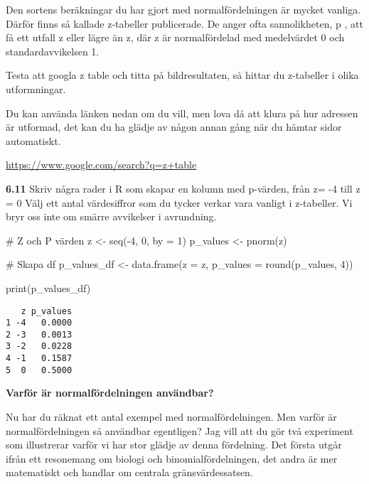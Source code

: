 \documentclass[
  letterpaper,
  DIV=11,
  numbers=noendperiod]{scrartcl}
\newenvironment{Shaded}{\begin{snugshade}}{\end{snugshade}}
\newcommand{\AttributeTok}[1]{\textcolor[rgb]{0.40,0.45,0.13}{#1}}
\newcommand{\CommentTok}[1]{\textcolor[rgb]{0.37,0.37,0.37}{#1}}
\newcommand{\DecValTok}[1]{\textcolor[rgb]{0.68,0.00,0.00}{#1}}
\newcommand{\FunctionTok}[1]{\textcolor[rgb]{0.28,0.35,0.67}{#1}}
\newcommand{\NormalTok}[1]{\textcolor[rgb]{0.00,0.23,0.31}{#1}}
\newcommand{\OtherTok}[1]{\textcolor[rgb]{0.00,0.23,0.31}{#1}}
\newcommand{\SpecialCharTok}[1]{\textcolor[rgb]{0.37,0.37,0.37}{#1}}
\begin{document}
Den sortens beräkningar du har gjort med normalfördelningen är mycket
vanliga. Därför finns så kallade z-tabeller publicerade. De anger ofta
sannolikheten, p , att få ett utfall z eller lägre än z, där z är
normalfördelad med medelvärdet 0 och standardavvikelsen 1.

Testa att googla z table och titta på bildresultaten, så hittar du
z-tabeller i olika utformningar.

Du kan använda länken nedan om du vill, men lova då att klura på hur
adressen är utformad, det kan du ha glädje av någon annan gång när du
hämtar sidor automatiskt.

\url{https://www.google.com/search?q=z+table}

\textbf{6.11} Skriv några rader i R som skapar en kolumn med p-värden,
från z= -4 till z = 0 Välj ett antal värdesiffror som du tycker verkar
vara vanligt i z-tabeller. Vi bryr oss inte om smärre avvikelser i
avrundning.

\begin{Shaded}
\begin{Highlighting}[]
\CommentTok{\# Z och P värden}
\NormalTok{z }\OtherTok{\textless{}{-}} \FunctionTok{seq}\NormalTok{(}\SpecialCharTok{{-}}\DecValTok{4}\NormalTok{, }\DecValTok{0}\NormalTok{, }\AttributeTok{by =} \DecValTok{1}\NormalTok{)}
\NormalTok{p\_values }\OtherTok{\textless{}{-}} \FunctionTok{pnorm}\NormalTok{(z)}

\CommentTok{\# Skapa df}
\NormalTok{p\_values\_df }\OtherTok{\textless{}{-}} \FunctionTok{data.frame}\NormalTok{(}\AttributeTok{z =}\NormalTok{ z, }\AttributeTok{p\_values =} \FunctionTok{round}\NormalTok{(p\_values, }\DecValTok{4}\NormalTok{))}

\FunctionTok{print}\NormalTok{(p\_values\_df)}
\end{Highlighting}
\end{Shaded}

\begin{verbatim}
   z p_values
1 -4   0.0000
2 -3   0.0013
3 -2   0.0228
4 -1   0.1587
5  0   0.5000
\end{verbatim}

\textbf{Varför är normalfördelningen användbar?}

Nu har du räknat ett antal exempel med normalfördelningen. Men varför är
normalfördelningen så användbar egentligen? Jag vill att du gör två
experiment som illustrerar varför vi har stor glädje av denna
fördelning. Det första utgår ifrån ett resonemang om biologi och
binomialfördelningen, det andra är mer matematiskt och handlar om
centrala gränsvärdessatsen.
\end{document}
